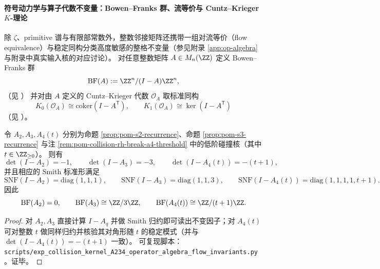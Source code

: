 






\paragraph{符号动力学与算子代数不变量：Bowen--Franks 群、流等价与 Cuntz--Krieger \texorpdfstring{$K$}{K}-理论}
除 \(\zeta\)、primitive 谱与有限部常数外，整数邻接矩阵还携带一组对流等价（flow equivalence）与稳定同构分类高度敏感的整格不变量（参见附录 \ref{app:op-algebra} 与附录中真实输入核的对应讨论）。
对任意整数矩阵 \(A\in M_n(\ZZ)\) 定义 Bowen--Franks 群
\[
\mathrm{BF}(A):=\ZZ^n/(I-A)\ZZ^n,
\]
（见 \cite{BowenFranks1977HomologyZeroDim}）
并对由 \(A\) 定义的 Cuntz--Krieger 代数 \(\mathcal O_A\) 取标准同构
\[
K_0(\mathcal O_A)\cong \mathrm{coker}(I-A^\mathsf T),\qquad
K_1(\mathcal O_A)\cong \ker(I-A^\mathsf T)
\]
（见 \cite{CuntzKrieger1980}）。

\begin{proposition}\label{prop:pom-collision-bf-snf-q234}
令 \(A_2,A_3,A_4(t)\) 分别为命题 \ref{prop:pom-s2-recurrence}、命题 \ref{prop:pom-s3-recurrence} 与注 \ref{rem:pom-collision-rh-break-a4-threshold} 中的低阶碰撞核（其中 \(t\in\ZZ_{\ge 0}\)）。
则有
\[
\det(I-A_2)=-1,\qquad \det(I-A_3)=-3,\qquad \det(I-A_4(t))=-(t+1),
\]
并且相应的 Smith 标准形满足
\[
\mathrm{SNF}(I-A_2)=\mathrm{diag}(1,1,1),\qquad
\mathrm{SNF}(I-A_3)=\mathrm{diag}(1,1,3),\qquad
\mathrm{SNF}(I-A_4(t))=\mathrm{diag}(1,1,1,1,t+1).
\]
因此
\[
\mathrm{BF}(A_2)=0,\qquad
\mathrm{BF}(A_3)\cong \ZZ/3\ZZ,\qquad
\mathrm{BF}(A_4(t))\cong \ZZ/(t+1)\ZZ.
\]
\end{proposition}
\begin{proof}
对 \(A_2,A_3\) 直接计算 \(I-A_q\) 并做 Smith 归约即可读出不变因子；对 \(A_4(t)\) 可对整数 \(t\) 做同样归约并核验其对角形随 \(t\) 的稳定模式（并与 \(\det(I-A_4(t))=-(t+1)\) 一致）。
可复现脚本：\texttt{scripts/exp\_collision\_kernel\_A234\_operator\_algebra\_flow\_invariants.py}。证毕。
\end{proof}


